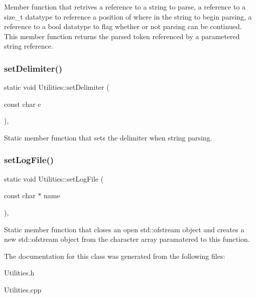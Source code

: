 Member function that retrives a reference to a string to parse, a reference to a size\+\_\+t datatype to reference a position of where in the string to begin parsing, a reference to a bool datatype to flag whether or not parsing can be continued. This member function returns the parsed token referenced by a parametered string reference. \mbox{\label{classUtilities_a833c24f770f9bd4c128cfc9dabb60a29}} 
\subsubsection{\texorpdfstring{set\+Delimiter()}{setDelimiter()}}
{\footnotesize\ttfamily static void Utilities\+::set\+Delimiter (\begin{DoxyParamCaption}\item[{const char}]{c }\end{DoxyParamCaption})\hspace{0.3cm}{\ttfamily [inline]}, {\ttfamily [static]}}

Static member function that sets the delimiter when string parsing. \mbox{\label{classUtilities_a63a49d3b5ff70602f519d045234e7992}} 
\subsubsection{\texorpdfstring{set\+Log\+File()}{setLogFile()}}
{\footnotesize\ttfamily static void Utilities\+::set\+Log\+File (\begin{DoxyParamCaption}\item[{const char $\ast$}]{name }\end{DoxyParamCaption})\hspace{0.3cm}{\ttfamily [inline]}, {\ttfamily [static]}}

Static member function that closes an open std\+::ofstream object and creates a new std\+::ofstream object from the character array paramatered to this function. 

The documentation for this class was generated from the following files\+:\begin{DoxyCompactItemize}
\item 
Utilities.\+h\item 
Utilities.\+cpp\end{DoxyCompactItemize}
